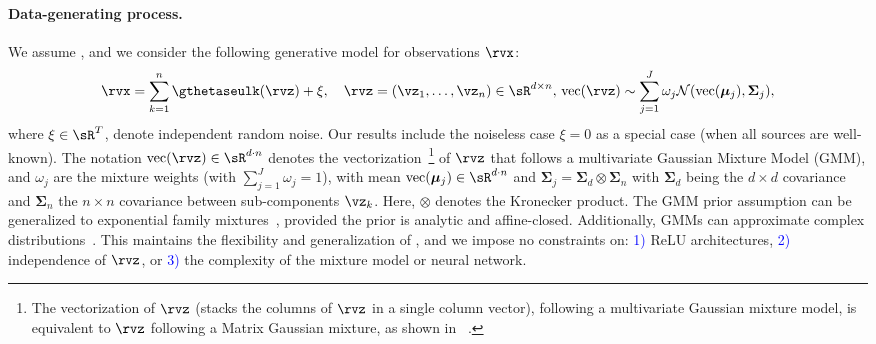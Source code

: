 \documentclass{article} %
\theoremstyle{plain}
\theoremstyle{definition}
\theoremstyle{remark}
\numberwithin{equation}{section}
\begin{document}
\paragraph{Data-generating process.} We assume ,  and we consider the following generative model for observations $\rvx$:
\begin{align}\label{eq:generative_model}
\rvx = \sum_{k=1}^{n} \gthetaseulk(\rvz) + \xi, \quad
\rvz = (\vz_{1},\ldots,\vz_{n}) \in \sR^{d \times n},\, \mathrm{vec}(\rvz) \sim \sum_{j=1}^J \omega_j \mathcal{N}(\mathrm{vec}(\boldsymbol{\mu}_j), \boldsymbol{\Sigma}_j),
\end{align} 
where $\xi \in \sR^{T}$, denote independent random noise. Our results include the noiseless case $\xi=0$ as a special case (\ie when all sources are well-known). The notation $\mathrm{vec}(\mathbf{\rvz}) \in \sR^{d\cdot n }$ denotes the vectorization~\footnote{The vectorization of $\rvz$ (\ie stacks the columns of $\rvz$ in a single column vector), following a multivariate Gaussian mixture model, is equivalent to $\rvz$ following a Matrix Gaussian mixture, as shown in ~.}
of $\rvz$ that follows a multivariate Gaussian Mixture Model (GMM), and $\omega_j$ are the mixture weights (with $\sum_{j=1}^J \omega_j = 1 $), with mean $\mathrm{vec}(\boldsymbol{\mu}_j) \in \sR^{d\cdot n } $ and $\boldsymbol\Sigma_j = \boldsymbol\Sigma_d \otimes \boldsymbol\Sigma_n$ with $\boldsymbol\Sigma_d$ being the $d \times d$ covariance and $\boldsymbol\Sigma_n$ the $n \times n$ covariance between sub-components \ie $\vz_k$. Here, \( \otimes \) denotes the Kronecker product. The GMM prior assumption can be generalized to exponential family mixtures~\citep{kivva2022identifiability}, provided the prior is analytic and affine-closed. Additionally, GMMs can approximate complex distributions~\citep{nguyen2019approximations}. This maintains the flexibility and generalization of , and we impose no constraints on:  \textcolor{blue}{1)} ReLU architectures, \textcolor{blue}{2)} independence of $\rvz$, or \textcolor{blue}{3)} the complexity of the mixture model or neural network.

\end{document}
